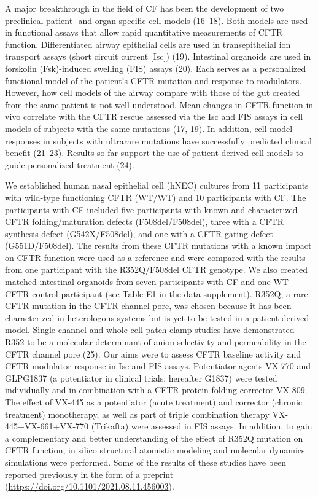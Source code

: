 A major breakthrough in the field of CF has been the development of two preclinical patient- and organ-specific cell models (16–18). Both models are used in functional assays that allow rapid quantitative measurements of CFTR function. Differentiated airway epithelial cells are used in transepithelial ion transport assays (short circuit current [Isc]) (19). Intestinal organoids are used in forskolin (Fsk)-induced swelling (FIS) assays (20). Each serves as a personalized functional model of the patient’s CFTR mutation and response to modulators. However, how cell models of the airway compare with those of the gut created from the same patient is not well understood. Mean changes in CFTR function in vivo correlate with the CFTR rescue assessed via the Isc and FIS assays in cell models of subjects with the same mutations (17, 19). In addition, cell model responses in subjects with ultrarare mutations have successfully predicted clinical benefit (21–23). Results so far support the use of patient-derived cell models to guide personalized treatment (24).

We established human nasal epithelial cell (hNEC) cultures from 11 participants with wild-type functioning CFTR (WT/WT) and 10 participants with CF. The participants with CF included five participants with known and characterized CFTR folding/maturation defects (F508del/F508del), three with a CFTR synthesis defect (G542X/F508del), and one with a CFTR gating defect (G551D/F508del). The results from these CFTR mutations with a known impact on CFTR function were used as a reference and were compared with the results from one participant with the R352Q/F508del CFTR genotype. We also created matched intestinal organoids from seven participants with CF and one WT-CFTR control participant (see Table E1 in the data supplement). R352Q, a rare CFTR mutation in the CFTR channel pore, was chosen because it has been characterized in heterologous systems but is yet to be tested in a patient-derived model. Single-channel and whole-cell patch-clamp studies have demonstrated R352 to be a molecular determinant of anion selectivity and permeability in the CFTR channel pore (25). Our aims were to assess CFTR baseline activity and CFTR modulator response in Isc and FIS assays. Potentiator agents VX-770 and GLPG1837 (a potentiator in clinical trials; hereafter G1837) were tested individually and in combination with a CFTR protein-folding corrector VX-809. The effect of VX-445 as a potentiator (acute treatment) and corrector (chronic treatment) monotherapy, as well as part of triple combination therapy VX-445+VX-661+VX-770 (Trikafta) were assessed in FIS assays. In addition, to gain a complementary and better understanding of the effect of R352Q mutation on CFTR function, in silico structural atomistic modeling and molecular dynamics simulations were performed. Some of the results of these studies have been reported previously in the form of a preprint (\href{https://doi.org/10.1101/2021.08.11.456003}{https://doi.org/10.1101/2021.08.11.456003}).


